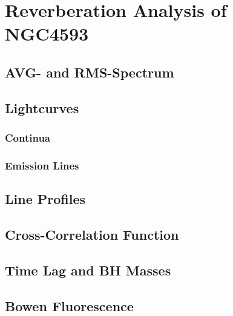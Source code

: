 \chapter{Reverberation Analysis of NGC4593}

\section{AVG- and RMS-Spectrum}

\section{Lightcurves}

\subsection{Continua}

\subsection{Emission Lines}

\section{Line Profiles}

\section{Cross-Correlation Function}

\section{Time Lag and BH Masses}

\section{Bowen Fluorescence}